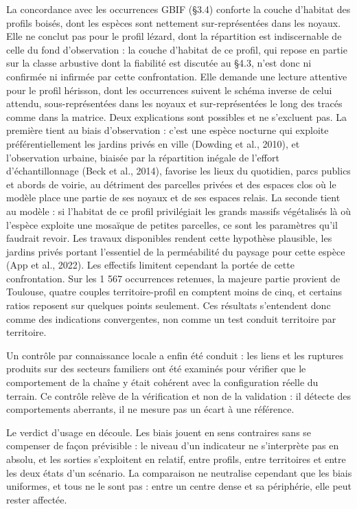 \documentclass[a4paper,12pt]{report}
\begin{document}
La concordance avec les occurrences GBIF (§3.4) conforte la couche d'habitat des profils boisés, dont les espèces sont nettement sur-représentées dans les noyaux. Elle ne conclut pas pour le profil lézard, dont la répartition est indiscernable de celle du fond d'observation : la couche d'habitat de ce profil, qui repose en partie sur la classe arbustive dont la fiabilité est discutée au §4.3, n'est donc ni confirmée ni infirmée par cette confrontation. Elle demande une lecture attentive pour le profil hérisson, dont les occurrences suivent le schéma inverse de celui attendu, sous-représentées dans les noyaux et sur-représentées le long des tracés comme dans la matrice. Deux explications sont possibles et ne s'excluent pas. La première tient au biais d'observation : c'est une espèce nocturne qui exploite préférentiellement les jardins privés en ville (Dowding et al., 2010), et l'observation urbaine, biaisée par la répartition inégale de l'effort d'échantillonnage (Beck et al., 2014), favorise les lieux du quotidien, parcs publics et abords de voirie, au détriment des parcelles privées et des espaces clos où le modèle place une partie de ses noyaux et de ses espaces relais. La seconde tient au modèle : si l'habitat de ce profil privilégiait les grands massifs végétalisés là où l'espèce exploite une mosaïque de petites parcelles, ce sont les paramètres qu'il faudrait revoir. Les travaux disponibles rendent cette hypothèse plausible, les jardins privés portant l'essentiel de la perméabilité du paysage pour cette espèce (App et al., 2022). Les effectifs limitent cependant la portée de cette confrontation. Sur les 1 567 occurrences retenues, la majeure partie provient de Toulouse, quatre couples territoire-profil en comptent moins de cinq, et certains ratios reposent sur quelques points seulement. Ces résultats s'entendent donc comme des indications convergentes, non comme un test conduit territoire par territoire.

Un contrôle par connaissance locale a enfin été conduit : les liens et les ruptures produits sur des secteurs familiers ont été examinés pour vérifier que le comportement de la chaîne y était cohérent avec la configuration réelle du terrain. Ce contrôle relève de la vérification et non de la validation : il détecte des comportements aberrants, il ne mesure pas un écart à une référence.

Le verdict d'usage en découle. Les biais jouent en sens contraires sans se compenser de façon prévisible : le niveau d'un indicateur ne s'interprète pas en absolu, et les sorties s'exploitent en relatif, entre profils, entre territoires et entre les deux états d'un scénario. La comparaison ne neutralise cependant que les biais uniformes, et tous ne le sont pas : entre un centre dense et sa périphérie, elle peut rester affectée.
\end{document}
